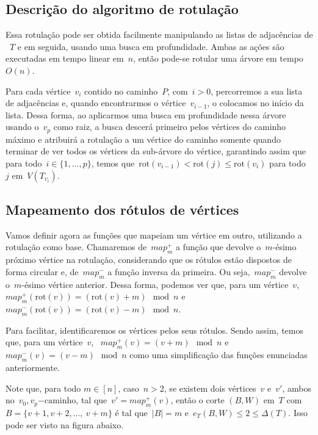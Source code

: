 \documentclass[a4paper,12pt]{article}
\newcommand{\caminho}{\mathrm{-caminho}}
\newcommand{\rot}{\mathrm{rot}}
\begin{document}
	\bigskip
	\bigskip

	\subsection{Descrição do algoritmo de rotulação}
	Essa rotulação pode ser obtida facilmente 
	manipulando as listas de adjacências de ~$T$ e em seguida,
	usando uma busca em profundidade.
	Ambas as ações são executadas em tempo linear em~$n$, então
	pode-se rotular uma árvore em tempo~$O(n)$.

	Para cada vértice~$v_i$ contido no caminho~$P$, com~$i>0$,
	percorremos a sua lista de adjacências e, quando encontrarmos o 
	vértice~$v_{i-1}$, o colocamos no início da lista.
	Dessa forma, ao aplicarmos uma busca em profundidade nessa 
	árvore usando o~$v_p$ como raiz, a busca descerá primeiro
	pelos vértices do caminho máximo e atribuirá a rotulação
	a um vértice do caminho
	somente quando terminar de ver todos os vértices da sub-árvore
	do vértice, 
	garantindo assim que para todo~$i\in \{1,\ldots, p\}$, temos 
	que~$\rot(v_{i-1})<\rot(j)\le\rot(v_i)$ para todo~$j$ 
	em~$V(T_{v_i})$.
	
	\bigskip
	\bigskip
	\bigskip

	\subsection{Mapeamento dos rótulos de vértices }
	Vamos definir agora as funções que mapeiam um vértice em 
	outro, utilizando a rotulação como base.
	Chamaremos de~${map^+_m}$ a função que devolve o~$m$-ésimo 
	próximo vértice na rotulação, considerando que os rótulos
	estão dispostos de forma circular
	e, de~${map^-_m}$ a função inversa da primeira. 
	Ou seja,~${map^-_m}$ devolve o~$m$-ésimo vértice anterior.
	Dessa forma, podemos ver que, para um 
	vértice~$v$,~${map^+_m(\rot(v)) =(\rot(v)+m)\mod n}$ 
	e~${map^-_m(\rot(v)) =(\rot(v)-m)\mod n}$.

	Para facilitar, identificaremos os vértices pelos seus 
	rótulos. 
	Sendo assim, temos que, para um 
	vértice~$v$, ~${map^+_m(v) =(v+m)\mod n}$ 
	e~${map^-_m(v) =(v-m)\mod n}$ como uma simplificação das 
	funções enunciadas anteriormente.

	Note que, para todo $m\in [n]$, caso~$n>2$, se existem
	dois vértices~$v$ e~$v'$, ambos no~$v_0,v_p\caminho$, 
	tal que~${v'= map^+_m(v)}$, então o corte $(B,W)$ em~$T$ 
	com~${B =\{v+1, v+2,\ldots,~v+m\}}$ é tal que~${|B|=m}$
	e~${e_T(B,W)\le 2\le \Delta(T)}$.
	Isso pode ser visto na figura abaixo.
\end{document}
